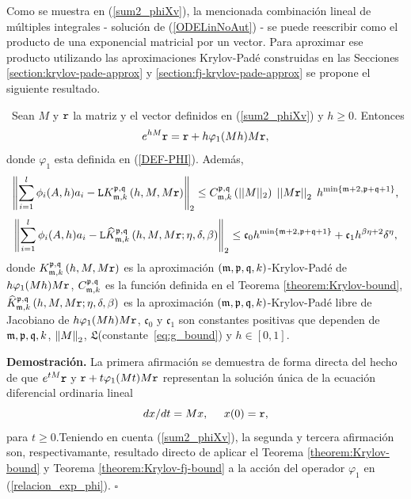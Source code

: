 Como se muestra en (\ref{sum2_phiXv}), la mencionada combinación lineal de múltiples integrales - solución de (\ref{ODELinNoAut}) - se puede reescribir como el producto de una exponencial matricial por un vector. Para aproximar ese producto utilizando las aproximaciones Krylov-Padé construidas en las Secciones \ref{section:krylov-pade-approx} y \ref{section:fj-krylov-pade-approx} se propone el siguiente resultado.

\begin{theorem} \label{theorem:Krylov-and-Krylov-fj-bounds}
	\cite{naranjo2023computing,naranjo2023RT}~Sean $M$ y $\mathtt{r}$ la matriz y el vector definidos en (\ref{sum2_phiXv}) y $h\geq 0$. Entonces
    \begin{equation}
    	e^{hM}\mathtt{r} = \mathtt{r} + h\varphi_1 (Mh)M\mathtt{r}, \label{relacion_exp_phi}
    \end{equation}
	donde $\varphi_1$ esta definida en (\ref{DEF-PHI}). Además,
	\begin{equation}
      \left\Vert\sum\limits_{i=1}^{l}\phi _{i}(A,h)a_{i}-	\mathtt{L} K_{\mathfrak{m},k}^{\mathfrak{p},\mathfrak{q}}\left(h, M, M\mathtt{r} \right)
      \right\Vert_2 \leq C_{\mathfrak{m},k}^{\mathfrak{p},\mathfrak{q}}\left(\lvert\lvert M \rvert\rvert_2\right) \;
	  \left\lvert \left\lvert M\mathtt{r} \right\rvert \right\rvert_2 \; h^{\mathrm{min}\left\{ \mathfrak{m}+2,\mathfrak{p}+\mathfrak{q}+1 \right\}}, \label{phi_approx}
	\end{equation}
	\begin{equation}
		\left\Vert \sum\limits_{i=1}^{l}\phi _{i}(A,h)a_{i} - \mathtt{L} \widehat{K}_{\mathfrak{m},k}^{\mathfrak{p},\mathfrak{q}}\left(h, M , M\mathtt{r} ; \eta, \delta, \beta \right)
		\right\Vert_2 \leq \mathfrak{c}_0 h^{\min\{\mathfrak{m}+2,\mathfrak{p}+\mathfrak{q}+1\}} + \mathfrak{c}_1 h^{\beta\eta+2}\delta^{\eta}, \label{phi_approx_fj}
	\end{equation}
	donde $K_{\mathfrak{m},k}^{\mathfrak{p},\mathfrak{q}}\left(h, M, M\mathtt{r} \right)$ es la aproximación $(\mathfrak{m} , \mathfrak{p} ,\mathfrak{q} , k)$-Krylov-Padé de $h\varphi_1 (Mh)M\mathtt{r}$,  $C_{\mathfrak{m},k}^{\mathfrak{p},\mathfrak{q}}$ es la función definida en el Teorema \ref{theorem:Krylov-bound}, $\widehat{K}_{\mathfrak{m},k}^{\mathfrak{p},\mathfrak{q}}\left(h, M , M\mathtt{r} ; \eta, \delta, \beta \right)$  es la aproximación $(\mathfrak{m} , \mathfrak{p} ,\mathfrak{q} , k)$-Krylov-Padé libre de Jacobiano de $h\varphi_1 (Mh)M\mathtt{r}$, $\mathfrak{c}_0$ y $\mathfrak{c}_1$ son constantes positivas que dependen de $\mathfrak{m},\mathfrak{p},\mathfrak{q},k$, $\left\lVert M \right\rVert_2$, $\mathfrak{L}$(constante~\ref{eq:g_bound}) y $h \in [0,1]$.
\end{theorem}
\textbf{Demostración.} La primera afirmación se demuestra de forma directa del hecho de que $e^{tM}\mathtt{r}$ y $\mathtt{r} + t\varphi_1 (Mt)M\mathtt{r}$ representan la solución única de la ecuación diferencial ordinaria lineal
\begin{equation}
	dx/dt= Mx,  \;\;\;\;\; x(0)=\mathtt{r}, \label{eq:lineal-eq-dem}
\end{equation}
para $t\geq0$.Teniendo en cuenta (\ref{sum2_phiXv}), la segunda y tercera afirmación son, respectivamante, resultado directo de aplicar el Teorema \ref{theorem:Krylov-bound} y Teorema \ref{theorem:Krylov-fj-bound} a la acción del operador $\varphi_1$ en (\ref{relacion_exp_phi}).
$\square$

